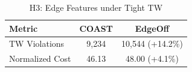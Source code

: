 \begin{table}[t]
\centering\caption{H3: Edge Features under Tight TW}\label{tab:h3}
\begin{tabular}{lcc}\toprule
Metric & COAST & EdgeOff \\ \midrule
TW Violations & 9,234 & 10,544 (+14.2\%) \\
Normalized Cost & 46.13 & 48.00 (+4.1\%) \\ \bottomrule
\end{tabular}\end{table}